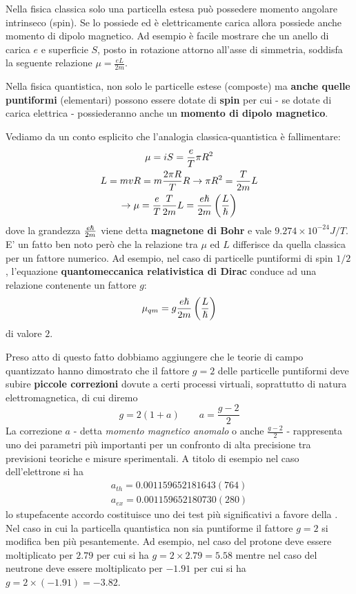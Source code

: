 Nella fisica classica solo una particella estesa può possedere momento angolare intrinseco (spin).
Se lo possiede ed è elettricamente carica allora possiede anche momento di dipolo magnetico.
Ad esempio è facile mostrare che un anello di carica $e$ e superficie $S$, posto in rotazione attorno all'asse di
simmetria, soddisfa la seguente relazione $\mu = \frac{eL}{2m}$.

Nella fisica quantistica, non solo le particelle estese (composte) ma \textbf{anche quelle puntiformi}  (elementari)
possono essere dotate di \textbf{spin} per cui - se dotate di carica elettrica - possiederanno anche un \textbf{momento di dipolo magnetico}.

Vediamo da un conto esplicito che l'analogia classica-quantistica è fallimentare:
\begin{gather*}
    \mu = i S = \frac{e}{T}\pi R^2 \\
    L = mvR = m \frac{2 \pi R}{T}R \rightarrow  \pi R^2 = \frac{T}{2m}L\\
     \rightarrow \mu = \frac{e}{T}\frac{T}{2m}L = \frac{e \hslash}{2m}\left( \frac{L}{\hslash}\right)
\end{gather*}
dove la grandezza $\frac{e \hslash}{2m}$ viene detta \textbf{magnetone di Bohr} e vale $9.274\times 10^{-24}J/T$.
E' un fatto ben noto però che la relazione tra $\mu$ ed $L$ differisce da quella classica per un fattore numerico.
Ad esempio, nel caso di particelle puntiformi di spin $1/2$, l'equazione \textbf{quantomeccanica relativistica di Dirac}
conduce ad una relazione contenente un fattore $g$:
\[
    \mu_{qm} = g \frac{e \hslash}{2m}\left( \frac{L}{\hslash}\right)
\]
di valore $2$.

Preso atto di questo fatto dobbiamo aggiungere che le teorie di campo quantizzato hanno dimostrato che il fattore $g=2$
delle particelle puntiformi deve subire \textbf{piccole correzioni} dovute a certi processi virtuali, soprattutto di natura elettromagnetica, di cui diremo
\[
g = 2(1+a) \qquad a = \frac{g -2}{2}
\]
La correzione $a$ - detta \emph{momento magnetico anomalo} o anche $\frac{g -2}{2}$ - rappresenta uno dei parametri più importanti per un confronto di alta precisione tra previsioni teoriche e misure sperimentali.
A titolo di esempio nel caso dell'elettrone si ha
\begin{gather*}
    a_{th} = 0.001 159 652 181 643 (764)\\
    a_{ex} = 0.001 159 652 180 730 (280)
\end{gather*}
lo stupefacente accordo costituisce uno dei test più significativi a favore della .
Nel caso in cui la particella quantistica non sia puntiforme il fattore $g=2$ si modifica ben più pesantemente.
Ad esempio, nel caso del protone deve essere moltiplicato per $2.79$ per cui si ha $g=2 \times 2.79=5.58$ mentre nel caso
del neutrone deve essere moltiplicato per $-1.91$ per cui si ha $g=2 \times(-1.91) = -3.82$.

